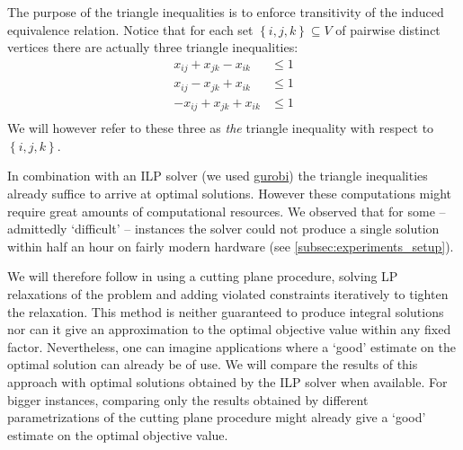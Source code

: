 The purpose of the triangle inequalities is to enforce transitivity of the induced equivalence relation.
Notice that for each set $\left\{ i,j,k \right\} \subseteq V$ of pairwise distinct vertices there are actually three triangle inequalities:
\begin{align*}
	x_{ij} + x_{jk} - x_{ik} &\leq 1\\
	x_{ij} - x_{jk} + x_{ik} &\leq 1\\
	- x_{ij} + x_{jk} + x_{ik} &\leq 1\\
\end{align*}
We will however refer to these three as \textit{the} triangle inequality with respect to $\left\{ i,j,k \right\}$.

In combination with an ILP solver (we used \href{www.gurobi.com}{gurobi}) the triangle inequalities already suffice to arrive at optimal solutions.
However these computations might require great amounts of computational resources.
We observed that for some – admittedly ‘difficult’ – instances the solver could not produce a single solution within half an hour on fairly modern hardware (see \cref{subsec:experiments_setup}).

We will therefore follow \cite{grotschelFacetsCliquePartitioning1990} in using a cutting plane procedure, \ie solving LP relaxations of the problem and adding violated constraints iteratively to tighten the relaxation.
This method is neither guaranteed to produce integral solutions nor can it give an approximation to the optimal objective value within any fixed factor.
Nevertheless, one can imagine applications where a ‘good’ estimate on the optimal solution can already be of use.
We will compare the results of this approach with optimal solutions obtained by the ILP solver when available.
For bigger instances, comparing only the results obtained by different parametrizations of the cutting plane procedure might already give a ‘good’ estimate on the optimal objective value.

